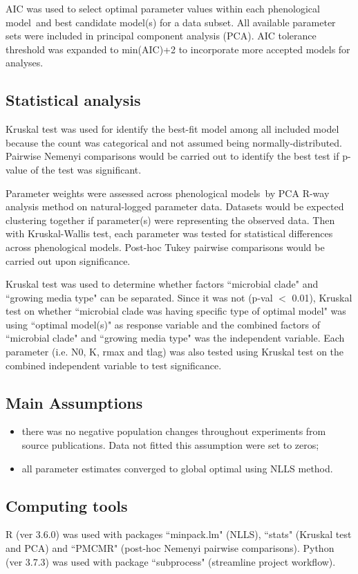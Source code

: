 \documentclass[a4paper, 11pt]{article}
\newcommand{\pml}{phenological model}
\newcommand{\pms}{phenological models}
\begin{document}
	AIC\autocite{johnson2004model,akaike1998information,burnhamdr} was used to select optimal parameter values within each \pml\ and best candidate model(s) for a data subset.  All available parameter sets were included in principal component analysis (PCA).  AIC tolerance threshold was expanded to min(AIC)+2\autocite{burnham2004multimodel} to incorporate more accepted models for analyses.
	
	\subsection*{Statistical analysis}
	Kruskal test was used for identify the best-fit model among all included model because the count was categorical and not assumed being normally-distributed.  Pairwise Nemenyi comparisons would be carried out to identify the best test if p-value of the test was significant.
	
	Parameter weights were assessed across \pms\ by PCA R-way analysis method on natural-logged parameter data.  Datasets would be expected clustering together if parameter(s) were representing the observed data.  Then with Kruskal-Wallis test, each parameter was tested for statistical differences across \pms.  Post-hoc Tukey pairwise comparisons would be carried out upon significance.
	
	Kruskal test was used to determine whether factors ``microbial clade" and ``growing media type" can be separated.  Since it was not (p-val $<$ 0.01), Kruskal test on whether ``microbial clade was having specific type of optimal model" was using ``optimal model(s)" as response variable and the combined factors of ``microbial clade" and ``growing media type" was the independent variable.  Each parameter (i.e. N0, K, rmax and tlag) was also tested using Kruskal test on the combined independent variable to test significance.
	
	\subsection*{Main Assumptions}
	\begin{itemize}
		\item there was no negative population changes throughout experiments from source publications.  Data not fitted this assumption were set to zeros;
		\item all parameter estimates converged to global optimal using NLLS method.
	\end{itemize}
	
	\subsection*{Computing tools}
	R (ver 3.6.0)\autocite{Rcore} was used with packages ``minpack.lm"\autocite{minpacklm} (NLLS), ``stats"\autocite{Rcore} (Kruskal test and PCA) and ``PMCMR"\autocite{PMCMR} (post-hoc Nemenyi pairwise comparisons).  Python (ver 3.7.3)\autocite{py3} was used with package ``subprocess"\autocite{py3} (streamline project workflow).
	
\end{document}
